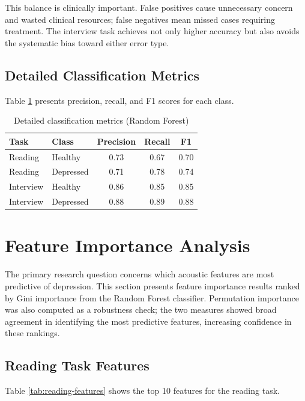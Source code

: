 This balance is clinically important. False positives cause unnecessary concern and wasted clinical resources; false negatives mean missed cases requiring treatment. The interview task achieves not only higher accuracy but also avoids the systematic bias toward either error type.

\subsection{Detailed Classification Metrics}

Table \ref{tab:detailed-metrics} presents precision, recall, and F1 scores for each class.

\begin{table}[h]
\centering
\caption{Detailed classification metrics (Random Forest)}
\label{tab:detailed-metrics}
\begin{tabular}{llccc}
\hline
\textbf{Task} & \textbf{Class} & \textbf{Precision} & \textbf{Recall} & \textbf{F1} \\
\hline
Reading & Healthy & 0.73 & 0.67 & 0.70 \\
Reading & Depressed & 0.71 & 0.78 & 0.74 \\
\hline
Interview & Healthy & 0.86 & 0.85 & 0.85 \\
Interview & Depressed & 0.88 & 0.89 & 0.88 \\
\hline
\end{tabular}
\end{table}

\section{Feature Importance Analysis}

The primary research question concerns which acoustic features are most predictive of depression. This section presents feature importance results ranked by Gini importance from the Random Forest classifier. Permutation importance was also computed as a robustness check; the two measures showed broad agreement in identifying the most predictive features, increasing confidence in these rankings.

\subsection{Reading Task Features}

Table \ref{tab:reading-features} shows the top 10 features for the reading task.

